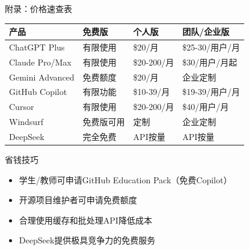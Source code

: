 \documentclass[aspectratio=169,11pt]{beamer}
\begin{document}
\begin{frame}{附录：价格速查表}
    \footnotesize
    \begin{tabular}{llll}
        \toprule
        \textbf{产品} & \textbf{免费版} & \textbf{个人版} & \textbf{团队/企业版} \\
        \midrule
        ChatGPT Plus & 有限使用 & \$20/月 & \$25-30/用户/月 \\
        Claude Pro/Max & 有限使用 & \$20-200/月 & \$30/用户/月起 \\
        Gemini Advanced & 免费额度 & \$20/月 & 企业定制 \\
        GitHub Copilot & 有限功能 & \$10-39/月 & \$19-39/用户/月 \\
        Cursor & 有限使用 & \$20-200/月 & \$40/用户/月 \\
        Windsurf & 免费版可用 & 定制 & 企业定制 \\
        DeepSeek & \textcolor{green!60!black}{完全免费} & API按量 & API按量 \\
        \bottomrule
    \end{tabular}
    
    \vspace{0.5cm}
    \begin{block}{省钱技巧}
        \begin{itemize}
            \item 学生/教师可申请GitHub Education Pack（免费Copilot）
            \item 开源项目维护者可申请免费额度
            \item 合理使用缓存和批处理API降低成本
            \item DeepSeek提供极具竞争力的免费服务
        \end{itemize}
    \end{block}
\end{frame}
\end{document}
